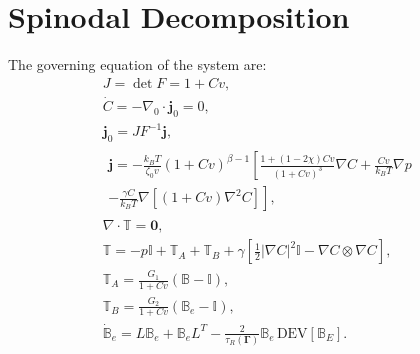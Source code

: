 \documentclass[12pt]{extarticle}
\newcommand{\B}{\ensuremath{\mathbb{B}}}
\begin{document}
\section{Spinodal Decomposition}
The governing equation of the system are:
\begin{gather}
J=\det F=1+Cv,\\
\dot{C} = -\nabla_0 \cdot \mathbf{j}_0 = 0,\\
\mathbf{j}_0= J F^{-1} \mathbf{j},\\[5mm]
\begin{aligned}
\mathbf{j} = -\frac{k_B T}{\zeta_0 v}\left(1+Cv\right)^{\beta-1}\left[ \frac{1+(1-2\chi)Cv}{(1+Cv)^3}\nabla C +\frac{Cv}{k_B T}\nabla p\right.\\
\left.- \frac{\gamma C}{k_BT}\nabla[(1+Cv)\nabla^2 C]\right],
\end{aligned}\\[5mm]
\nabla \cdot \mathbb{T} = \mathbf{0},\\[5mm]
\mathbb{T}= -p \mathbb{I} +\mathbb{T}_A +\mathbb{T}_B + \gamma\left[\frac{1}{2} |\nabla C|^2\mathbb{I}-\nabla C \otimes \nabla C\right],\\[5mm]
\mathbb{T}_A=\frac{G_1}{1+Cv}(\B-\mathbb{I}),\\
\mathbb{T}_B=\frac{G_2}{1+Cv}(\B_e-\mathbb{I}),\\[5mm]
\dot{\B}_e= L \B_e +\B_e L^T - \frac{2}{\tau_R(\boldsymbol{\Gamma})} \B_e \,\text{DEV}[\B_E].
\end{gather}
\end{document}
